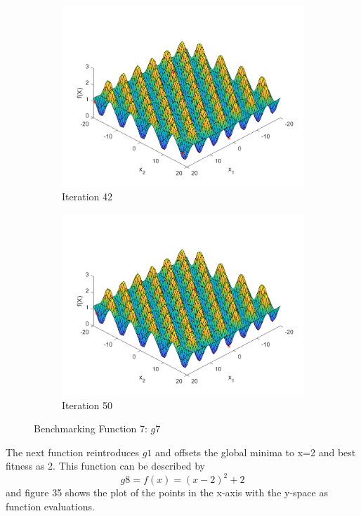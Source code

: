 \begin{figure}
\begin{subfigure}[b]{0.4\textwidth}
   \includegraphics[width=\textwidth]{img/smpl/grwnk2d/loa-iter-42}
   \caption{Iteration 42}
   \label{fig:s7-iter-6}
 \end{subfigure}
 \begin{subfigure}[b]{0.4\textwidth}
   \includegraphics[width=\textwidth]{img/smpl/grwnk2d/loa-iter-50}
   \caption{Iteration 50}
   \label{fig:s7-iter-7}
 \end{subfigure}
 \caption{Benchmarking Function 7: $g7$}
\end{figure}

\par The next function reintroduces $g1$ and offsets the global minima to x=2 and best fitness as 2. This function can be described by
$$
g8=f(x) = (x-2)^2 + 2
$$
and figure 35 shows the plot of the points in the x-axis with the y-space as function evaluations.

